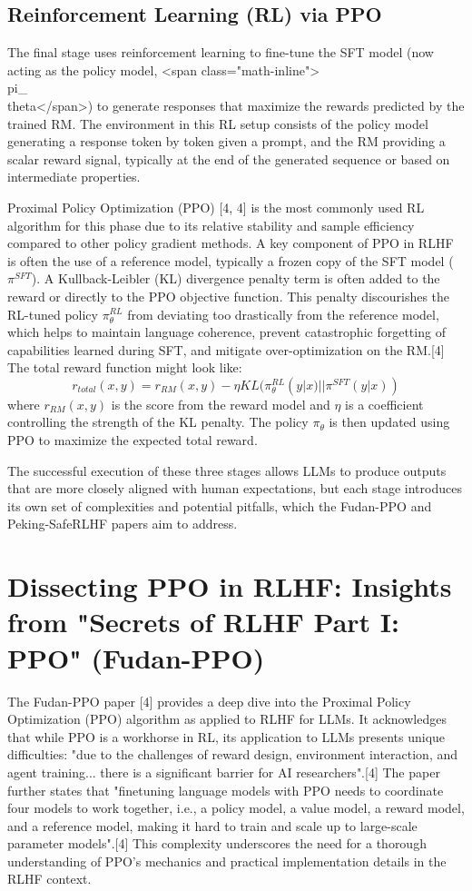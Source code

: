 \documentclass[10pt,journal,compsoc]{IEEEtran} %
\begin{document}
\subsection{Reinforcement Learning (RL) via PPO}
The final stage uses reinforcement learning to fine-tune the SFT model (now acting as the policy model, <span class="math-inline">\\pi\_\\theta</span>) to generate responses that maximize the rewards predicted by the trained RM. The environment in this RL setup consists of the policy model generating a response token by token given a prompt, and the RM providing a scalar reward signal, typically at the end of the generated sequence or based on intermediate properties.

Proximal Policy Optimization (PPO) [4, 4] is the most commonly used RL algorithm for this phase due to its relative stability and sample efficiency compared to other policy gradient methods. A key component of PPO in RLHF is often the use of a reference model, typically a frozen copy of the SFT model ($\pi^{SFT}$). A Kullback-Leibler (KL) divergence penalty term is often added to the reward or directly to the PPO objective function. This penalty discourishes the RL-tuned policy $\pi_\theta^{RL}$ from deviating too drastically from the reference model, which helps to maintain language coherence, prevent catastrophic forgetting of capabilities learned during SFT, and mitigate over-optimization on the RM.[4] The total reward function might look like:
$$ r_{total}(x,y) = r_{RM}(x,y) - \eta KL(\pi_\theta^{RL}(y|x) |
| \pi^{SFT}(y|x)) $$
where $r_{RM}(x,y)$ is the score from the reward model and $\eta$ is a coefficient controlling the strength of the KL penalty. The policy $\pi_\theta$ is then updated using PPO to maximize the expected total reward.

The successful execution of these three stages allows LLMs to produce outputs that are more closely aligned with human expectations, but each stage introduces its own set of complexities and potential pitfalls, which the Fudan-PPO and Peking-SafeRLHF papers aim to address.

\section{Dissecting PPO in RLHF: Insights from "Secrets of RLHF Part I: PPO" (Fudan-PPO)}
\label{sec:fudan_ppo}

The Fudan-PPO paper [4] provides a deep dive into the Proximal Policy Optimization (PPO) algorithm as applied to RLHF for LLMs. It acknowledges that while PPO is a workhorse in RL, its application to LLMs presents unique difficulties: "due to the challenges of reward design, environment interaction, and agent training... there is a significant barrier for AI researchers".[4] The paper further states that "finetuning language models with PPO needs to coordinate four models to work together, i.e., a policy model, a value model, a reward model, and a reference model, making it hard to train and scale up to large-scale parameter models".[4] This complexity underscores the need for a thorough understanding of PPO's mechanics and practical implementation details in the RLHF context.
\end{document}
